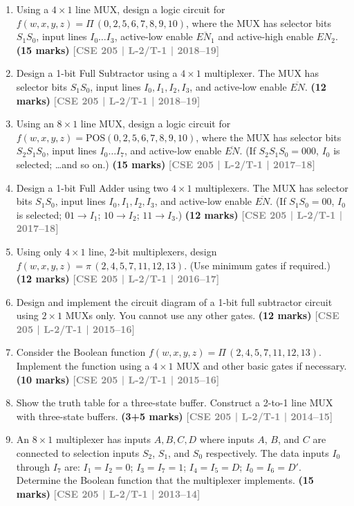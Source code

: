 \documentclass[12pt]{article}
\newcommand{\yr}[1]{\hfill\textcolor{gray}{\small\textbf{[#1]}}}
\newcommand{\mk}[1]{\textcolor{orange!70!black}{\small\textbf{(#1 marks)}}}
\begin{document}
\begin{enumerate}
\item Using a $4\times1$ line MUX, design a logic circuit for $f(w,x,y,z) = \Pi\,(0,2,5,6,7,8,9,10)$, where the MUX has selector bits $S_1S_0$, input lines $I_0\ldots I_3$, active-low enable $\overline{EN_1}$ and active-high enable $EN_2$.
\mk{15} \yr{CSE 205 | L-2/T-1 | 2018--19}

\item Design a 1-bit Full Subtractor using a $4\times1$ multiplexer. The MUX has selector bits $S_1S_0$, input lines $I_0, I_1, I_2, I_3$, and active-low enable $\overline{EN}$.
\mk{12} \yr{CSE 205 | L-2/T-1 | 2018--19}

\item Using an $8\times1$ line MUX, design a logic circuit for $f(w,x,y,z) = \mathrm{POS}(0,2,5,6,7,8,9,10)$, where the MUX has selector bits $S_2S_1S_0$, input lines $I_0\ldots I_7$, and active-low enable $\overline{EN}$. (If $S_2S_1S_0 = 000$, $I_0$ is selected; \ldots and so on.)
\mk{15} \yr{CSE 205 | L-2/T-1 | 2017--18}

\item Design a 1-bit Full Adder using two $4\times1$ multiplexers. The MUX has selector bits $S_1S_0$, input lines $I_0, I_1, I_2, I_3$, and active-low enable $\overline{EN}$. (If $S_1S_0 = 00$, $I_0$ is selected; $01 \to I_1$; $10 \to I_2$; $11 \to I_3$.)
\mk{12} \yr{CSE 205 | L-2/T-1 | 2017--18}

\item Using only $4\times1$ line, 2-bit multiplexers, design $f(w,x,y,z) = \pi\,(2,4,5,7,11,12,13)$. (Use minimum gates if required.)
\mk{12} \yr{CSE 205 | L-2/T-1 | 2016--17}

\item Design and implement the circuit diagram of a 1-bit full subtractor circuit using $2\times1$ MUXs only. You cannot use any other gates.
\mk{12} \yr{CSE 205 | L-2/T-1 | 2015--16}

\item Consider the Boolean function $f(w, x, y, z) = \Pi\,(2,4,5,7,11,12,13)$. Implement the function using a $4 \times 1$ MUX and other basic gates if necessary.
\mk{10} \yr{CSE 205 | L-2/T-1 | 2015--16}

\item Show the truth table for a three-state buffer. Construct a 2-to-1 line MUX with three-state buffers.
\mk{3+5} \yr{CSE 205 | L-2/T-1 | 2014--15}

\item An $8 \times 1$ multiplexer has inputs $A, B, C, D$ where inputs $A$, $B$, and $C$ are connected to selection inputs $S_2$, $S_1$, and $S_0$ respectively. The data inputs $I_0$ through $I_7$ are: $I_1 = I_2 = 0$; $I_3 = I_7 = 1$; $I_4 = I_5 = D$; $I_0 = I_6 = D'$. Determine the Boolean function that the multiplexer implements.
\mk{15} \yr{CSE 205 | L-2/T-1 | 2013--14}


\end{enumerate}
\end{document}
